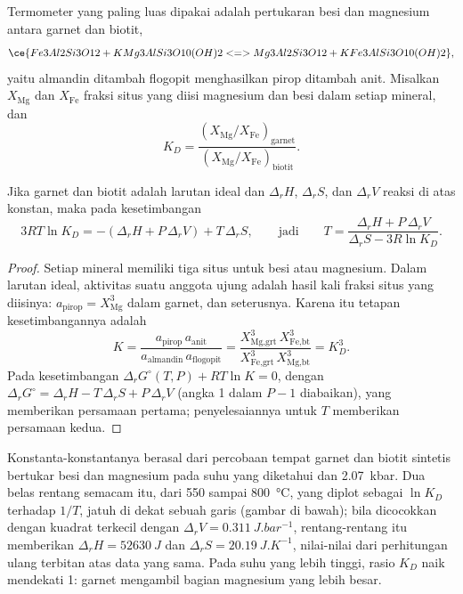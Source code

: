 Termometer  yang paling luas dipakai adalah pertukaran besi dan magnesium
antara garnet dan biotit,
\[
\ce{Fe3Al2Si3O12 + KMg3AlSi3O10(OH)2 <=> Mg3Al2Si3O12 + KFe3AlSi3O10(OH)2},
\]
yaitu almandin ditambah flogopit menghasilkan pirop ditambah anit. Misalkan $X_{\text{Mg}}$ dan $X_{\text{Fe}}$
fraksi situs yang diisi magnesium dan besi dalam setiap mineral, dan
\[
K_D = \frac{(X_{\text{Mg}}/X_{\text{Fe}})_{\text{garnet}}}{(X_{\text{Mg}}/X_{\text{Fe}})_{\text{biotit}}}.
\]

\begin{proposition}\label{prop:b2:pt-paths:exchange}
Jika garnet dan biotit adalah larutan ideal dan $\Delta_r H$, $\Delta_r S$, dan $\Delta_r V$
reaksi di atas konstan, maka pada kesetimbangan
\[
3RT\ln K_D = -(\Delta_r H + P\,\Delta_r V) + T\,\Delta_r S,
\qquad\text{jadi}\qquad
T = \frac{\Delta_r H + P\,\Delta_r V}{\Delta_r S - 3R\ln K_D}.
\]
\end{proposition}

\begin{proof}
Setiap mineral memiliki tiga situs untuk besi atau magnesium. Dalam larutan ideal, aktivitas
suatu anggota ujung adalah hasil kali fraksi situs yang diisinya: $a_{\text{pirop}} =
X_{\text{Mg}}^3$ dalam garnet, dan seterusnya. Karena itu tetapan kesetimbangannya adalah
\[
K = \frac{a_{\text{pirop}}\,a_{\text{anit}}}{a_{\text{almandin}}\,a_{\text{flogopit}}}
= \frac{X_{\text{Mg,grt}}^3\,X_{\text{Fe,bt}}^3}{X_{\text{Fe,grt}}^3\,X_{\text{Mg,bt}}^3} = K_D^3 .
\]
Pada kesetimbangan $\Delta_r G^\circ(T, P) + RT\ln K = 0$, dengan $\Delta_r G^\circ = \Delta_r H -
T\,\Delta_r S + P\,\Delta_r V$ (angka 1 dalam $P - 1$ diabaikan), yang memberikan persamaan pertama;
penyelesaiannya untuk $T$ memberikan persamaan kedua.
\end{proof}

Konstanta-konstantanya berasal dari percobaan tempat garnet dan biotit sintetis bertukar besi
dan magnesium pada suhu yang diketahui dan \qty{2.07}{kbar}. Dua belas rentang semacam itu, dari 550 sampai
\qty{800}{\celsius}, yang diplot sebagai $\ln K_D$ terhadap $1/T$, jatuh di dekat sebuah garis (gambar
di bawah); bila dicocokkan dengan kuadrat terkecil dengan $\Delta_r V = \qty{0.311}{J.bar^{-1}}$, rentang-rentang itu memberikan
$\Delta_r H = \qty{52630}{J}$ dan $\Delta_r S = \qty{20.19}{J.K^{-1}}$, nilai-nilai dari
perhitungan ulang terbitan atas data yang sama. Pada suhu yang lebih tinggi, rasio $K_D$ naik
mendekati 1: garnet mengambil bagian magnesium yang lebih besar.

